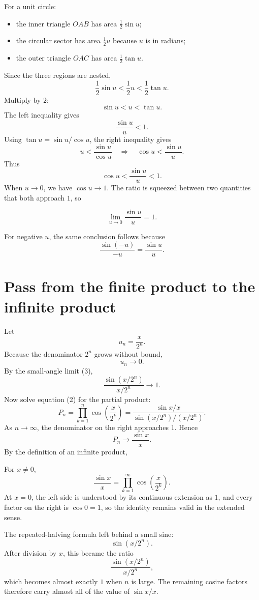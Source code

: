 \documentclass[11pt]{article}
\begin{document}
For a unit circle:
\begin{itemize}
  \item the inner triangle \(OAB\) has area \(\tfrac12\sin u\);
  \item the circular sector has area \(\tfrac12u\) because \(u\) is in radians;
  \item the outer triangle \(OAC\) has area \(\tfrac12\tan u\).
\end{itemize}
Since the three regions are nested,
\[
  \frac12\sin u<\frac12u<\frac12\tan u.
\]
Multiply by \(2\):
\[
  \sin u<u<\tan u.
\]
The left inequality gives
\[
  \frac{\sin u}{u}<1.
\]
Using \(\tan u=\sin u/\cos u\), the right inequality gives
\[
  u<\frac{\sin u}{\cos u}
  \quad\Longrightarrow\quad
  \cos u<\frac{\sin u}{u}.
\]
Thus
\[
  \cos u<\frac{\sin u}{u}<1.
\]
When \(u\to0\), we have \(\cos u\to1\). The ratio is squeezed between two quantities that both approach \(1\), so
\begin{solutionBox}
\[
  \boxed{\displaystyle \lim_{u\to0}\frac{\sin u}{u}=1.}
\tag{3}
\]
\end{solutionBox}
For negative \(u\), the same conclusion follows because
\[
  \frac{\sin(-u)}{-u}=\frac{\sin u}{u}.
\]

\section{Pass from the finite product to the infinite product}

Let
\[
  u_n=\frac{x}{2^n}.
\]
Because the denominator \(2^n\) grows without bound,
\[
  u_n\longrightarrow0.
\]
By the small-angle limit (3),
\[
  \frac{\sin(x/2^n)}{x/2^n}\longrightarrow1.
\]
Now solve equation (2) for the partial product:
\[
  P_n
  =\prod_{k=1}^{n}\cos\!\left(\frac{x}{2^k}\right)
  =\frac{\sin x/x}{\sin(x/2^n)/(x/2^n)}.
\]
As \(n\to\infty\), the denominator on the right approaches \(1\). Hence
\[
  P_n\longrightarrow\frac{\sin x}{x}.
\]
By the definition of an infinite product,
\begin{solutionBox}
For \(x\ne0\),
\[
\boxed{\displaystyle
  \frac{\sin x}{x}
  =\prod_{k=1}^{\infty}
   \cos\!\left(\frac{x}{2^k}\right).}
\tag{4}
\]
At \(x=0\), the left side is understood by its continuous extension as \(1\), and every factor on the right is \(\cos0=1\), so the identity remains valid in the extended sense.
\end{solutionBox}

\begin{ideaBox}
The repeated-halving formula left behind a small sine:
\[
  \sin(x/2^n).
\]
After division by \(x\), this became the ratio
\[
  \frac{\sin(x/2^n)}{x/2^n},
\]
which becomes almost exactly \(1\) when \(n\) is large. The remaining cosine factors therefore carry almost all of the value of \(\sin x/x\).
\end{ideaBox}
\end{document}
